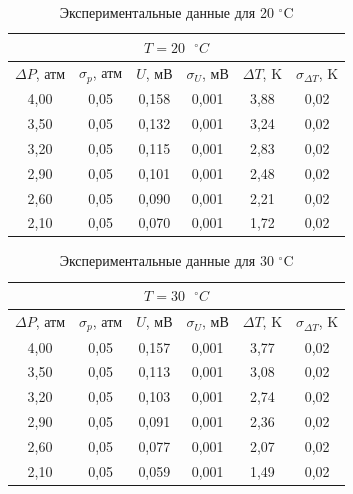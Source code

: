 \documentclass[a4paper,12pt]{article} %
\begin{document}
\begin{table}[H]
	\centering
	\begin{tabular}{|c|c|c|c|c|c|}
		\hline
		\multicolumn{6}{|c|}{$ T = 20 \text{ } ^\circ C $} \\ \hline
		$ \Delta P $, атм & $ \sigma_p $, атм & $ U $, мВ & $ \sigma_U $, мВ & $ \Delta T $, K & $ \sigma_{\Delta T} $, K \\ \hline
		4,00 & 0,05 & 0,158 & 0,001 & 3,88 & 0,02 \\ \hline
		3,50 & 0,05 & 0,132 & 0,001 & 3,24 & 0,02 \\ \hline
		3,20 & 0,05 & 0,115 & 0,001 & 2,83 & 0,02 \\ \hline
		2,90 & 0,05 & 0,101 & 0,001 & 2,48 & 0,02 \\ \hline
		2,60 & 0,05 & 0,090 & 0,001 & 2,21 & 0,02 \\ \hline
		2,10 & 0,05 & 0,070 & 0,001 & 1,72 & 0,02 \\ \hline
	\end{tabular}
	\caption{Экспериментальные данные для 20 $^\circ$C}
	\label{tab:20C}
\end{table}

\begin{table}[H]
	\centering
	\begin{tabular}{|c|c|c|c|c|c|}
		\hline
		\multicolumn{6}{|c|}{$ T = 30 \text{ } ^\circ C $} \\ \hline
		$ \Delta P $, атм & $ \sigma_p $, атм & $ U $, мВ & $ \sigma_U $, мВ & $ \Delta T $, K & $ \sigma_{\Delta T} $, K \\ \hline
		4,00 & 0,05 & 0,157 & 0,001 & 3,77 & 0,02 \\ \hline
		3,50 & 0,05 & 0,113 & 0,001 & 3,08 & 0,02 \\ \hline
		3,20 & 0,05 & 0,103 & 0,001 & 2,74 & 0,02 \\ \hline
		2,90 & 0,05 & 0,091 & 0,001 & 2,36 & 0,02 \\ \hline
		2,60 & 0,05 & 0,077 & 0,001 & 2,07 & 0,02 \\ \hline
		2,10 & 0,05 & 0,059 & 0,001 & 1,49 & 0,02 \\ \hline
	\end{tabular}
	\caption{Экспериментальные данные для 30 $^\circ$C}
	\label{tab:30C}
\end{table}
\end{document}
